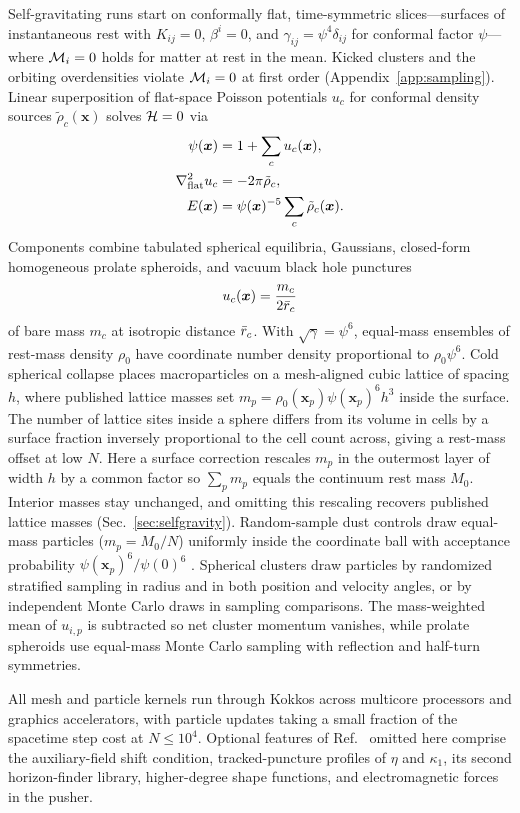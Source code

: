 Self-gravitating runs start on conformally flat, time-symmetric slices---surfaces of instantaneous rest with $K_{ij} = 0$, $\beta^i = 0$, and $\gamma_{ij} = \psi^4 \delta_{ij}$ for conformal factor $\psi$---where $\mathcal{M}_i = 0$ holds for matter at rest in the mean. Kicked clusters and the orbiting overdensities violate $\mathcal{M}_i = 0$ at first order (Appendix~\ref{app:sampling}). Linear superposition of flat-space Poisson potentials $u_c$ for conformal density sources $\tilde{\rho}_c(\bm{x})$ solves $\mathcal{H} = 0$ via
\begin{align}\label{eq:initial_superposition}
\psi(\bm{x}) &= 1 + \sum_{c} u_c(\bm{x}), \nonumber\\
\nabla_{\rm flat}^2 u_c &= -2\pi \tilde{\rho}_c, \nonumber\\
E(\bm{x}) &= \psi(\bm{x})^{-5} \sum_{c} \tilde{\rho}_c(\bm{x}).
\end{align}
Components combine tabulated spherical equilibria, Gaussians, closed-form homogeneous prolate spheroids, and vacuum black hole punctures
\begin{equation}\label{eq:puncture_potential}
u_c(\bm{x}) = \frac{m_c}{2\bar{r}_c}
\end{equation}
of bare mass $m_c$ at isotropic distance $\bar{r}_c$. With $\sqrt{\gamma} = \psi^6$, equal-mass ensembles of rest-mass density $\rho_0$ have coordinate number density proportional to $\rho_0 \psi^6$. Cold spherical collapse places macroparticles on a mesh-aligned cubic lattice of spacing $h$, where published lattice masses \cite{Wu:2026nrpic} set $m_p = \rho_0(\bm{x}_p)\psi(\bm{x}_p)^6 h^3$ inside the surface. The number of lattice sites inside a sphere differs from its volume in cells by a surface fraction inversely proportional to the cell count across, giving a rest-mass offset at low $N$. Here a surface correction rescales $m_p$ in the outermost layer of width $h$ by a common factor so $\sum_p m_p$ equals the continuum rest mass $M_0$. Interior masses stay unchanged, and omitting this rescaling recovers published lattice masses (Sec.~\ref{sec:selfgravity}). Random-sample dust controls draw equal-mass particles ($m_p = M_0 / N$) uniformly inside the coordinate ball with acceptance probability $\psi(\bm{x}_p)^6 / \psi(0)^6$ \cite{Wu:2026nrpic}. Spherical clusters draw particles by randomized stratified sampling in radius and in both position and velocity angles, or by independent Monte Carlo draws in sampling comparisons. The mass-weighted mean of $u_{i,p}$ is subtracted so net cluster momentum vanishes, while prolate spheroids use equal-mass Monte Carlo sampling with reflection and half-turn symmetries.

All mesh and particle kernels run through Kokkos \cite{2022ITPDS..33..805T,2026ApJS..283...27S} across multicore processors and graphics accelerators, with particle updates taking a small fraction of the spacetime step cost at $N \le 10^4$. Optional features of Ref.~\cite{Wu:2026nrpic} omitted here comprise the auxiliary-field shift condition, tracked-puncture profiles of $\eta$ and $\kappa_1$, its second horizon-finder library, higher-degree shape functions, and electromagnetic forces in the pusher.
